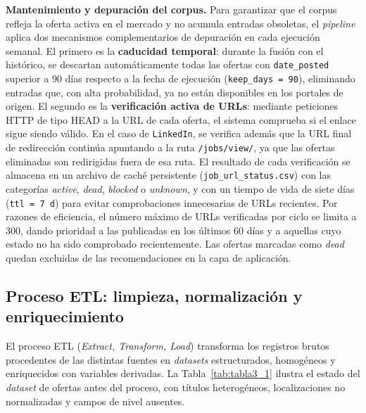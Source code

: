 \textbf{Mantenimiento y depuración del corpus.} Para garantizar que el corpus refleja la oferta activa en el mercado y no acumula entradas obsoletas, el \textit{pipeline} aplica dos mecanismos complementarios de depuración en cada ejecución semanal. El primero es la \textbf{caducidad temporal}: durante la fusión con el histórico, se descartan automáticamente todas las ofertas con \texttt{date\_posted} superior a 90 días respecto a la fecha de ejecución (\texttt{keep\_days\,=\,90}), eliminando entradas que, con alta probabilidad, ya no están disponibles en los portales de origen. El segundo es la \textbf{verificación activa de URLs}: mediante peticiones HTTP de tipo HEAD a la URL de cada oferta, el sistema comprueba si el enlace sigue siendo válido. En el caso de \texttt{LinkedIn}, se verifica además que la URL final de redirección continúa apuntando a la ruta \texttt{/jobs/view/}, ya que las ofertas eliminadas son redirigidas fuera de esa ruta. El resultado de cada verificación se almacena en un archivo de caché persistente (\texttt{job\_url\_status.csv}) con las categorías \textit{active}, \textit{dead}, \textit{blocked} o \textit{unknown}, y con un tiempo de vida de siete días (\texttt{ttl\,=\,7\,d}) para evitar comprobaciones innecesarias de URLs recientes. Por razones de eficiencia, el número máximo de URLs verificadas por ciclo se limita a 300, dando prioridad a las publicadas en los últimos 60 días y a aquellas cuyo estado no ha sido comprobado recientemente. Las ofertas marcadas como \textit{dead} quedan excluidas de las recomendaciones en la capa de aplicación.

\subsection{Proceso ETL: limpieza, normalización y enriquecimiento}
\label{subsec:proceso_etl}
El proceso ETL (\textit{Extract, Transform, Load}) transforma los registros brutos procedentes de las distintas fuentes en \textit{datasets} estructurados, homogéneos y enriquecidos con variables derivadas. La Tabla~\ref{tab:tabla3_1} ilustra el estado del \textit{dataset} de ofertas antes del proceso, con títulos heterogéneos, localizaciones no normalizadas y campos de nivel ausentes.

